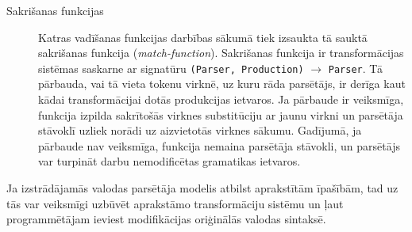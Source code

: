 \documentclass[12pt]{report}
\begin{document}
\begin{description}
\item[Sakrišanas funkcijas]
Katras vadīšanas funkcijas darbības sākumā tiek izsaukta tā sauktā sakrišanas funkcija (\emph{match-function}). Sakrišanas funkcija ir transformācijas sistēmas saskarne ar signatūru \verb|(Parser, Production)| $\to$ \verb|Parser|. Tā pārbauda, vai tā vieta tokenu virknē, uz kuru rāda parsētājs, ir derīga kaut kādai transformācijai dotās produkcijas ietvaros. Ja pārbaude ir veiksmīga, funkcija izpilda sakrītošās virknes substitūciju ar jaunu virkni un parsētāja stāvoklī uzliek norādi uz aizvietotās virknes sākumu. Gadījumā,  ja pārbaude nav veiksmīga, funkcija nemaina parsētāja stāvokli, un parsētājs var turpināt darbu nemodificētas gramatikas ietvaros.
\end{description}

Ja izstrādājamās valodas parsētāja modelis atbilst aprakstītām īpašībām, tad uz tās var veiksmīgi uzbūvēt aprakstāmo transformāciju sistēmu un ļaut programmētājam ieviest modifikācijas oriģinālās valodas sintaksē.

{}

\end{document}
